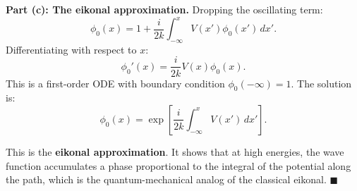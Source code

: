 \documentclass[12pt]{article}
\begin{document}
\textbf{Part (c): The eikonal approximation.}
Dropping the oscillating term:
\[
\phi_0(x) = 1 + \frac{i}{2k}\int_{-\infty}^{x}V(x')\phi_0(x')\,dx'.
\]
Differentiating with respect to $x$:
\[
\boxed{\phi_0'(x) = \frac{i}{2k}V(x)\phi_0(x).}
\]
This is a first-order ODE with boundary condition $\phi_0(-\infty) = 1$. The solution is:
\[
\boxed{\phi_0(x) = \exp\left[\frac{i}{2k}\int_{-\infty}^{x}V(x')\,dx'\right].}
\]

This is the \textbf{eikonal approximation}. It shows that at high energies, the wave function accumulates a phase proportional to the integral of the potential along the path, which is the quantum-mechanical analog of the classical eikonal. $\blacksquare$
\end{document}
